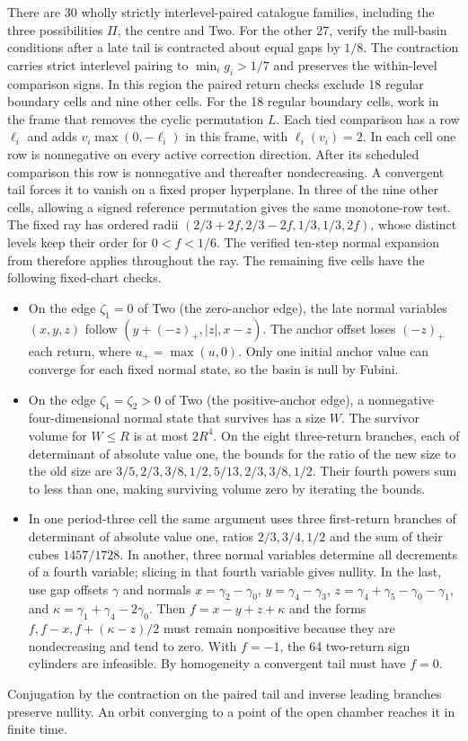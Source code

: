 \documentclass[11pt,reqno]{amsart}
\theoremstyle{definition}
\begin{document}
There are 30 wholly strictly interlevel-paired catalogue families,
including the three possibilities \(\Pi\), the centre and Two.
For the other 27, verify the null-basin conditions after
a late tail is contracted about equal gaps by \(1/8\).
The contraction carries strict interlevel pairing to
\(\min_i g_i>1/7\) and preserves the within-level comparison signs.
In this region the paired return
checks exclude 18 regular boundary cells and nine other cells.
For the 18 regular boundary cells, work in the frame that
removes the cyclic permutation \(L\). Each tied comparison has
a row \(\ell_i\) and adds \(v_i\max(0,-\ell_i)\) in this frame,
with \(\ell_i(v_i)=2\). In each cell one row is nonnegative on
every active correction direction. After its scheduled comparison
this row is nonnegative and thereafter nondecreasing. A
convergent tail forces it to vanish on a fixed proper hyperplane.
In three of the nine other cells, allowing a signed reference
permutation gives the same monotone-row test. The fixed ray
has ordered radii \((2/3+2f,2/3-2f,1/3,1/3,2f)\), whose distinct
levels keep their order for \(0<f<1/6\). The verified ten-step
normal expansion from \cite[Section~3]{G6} therefore applies
throughout the ray. The remaining five cells have the following
fixed-chart checks.
\begin{itemize}
\item On the edge \(\zeta_1=0\) of Two (the zero-anchor edge), the late
  normal variables \((x,y,z)\) follow \((y+(-z)_+,|z|,x-z)\). The anchor
  offset loses \((-z)_+\) each return, where \(u_+=\max(u,0)\).
  Only one initial anchor value can converge for each fixed
  normal state, so the basin is null by Fubini.
\item On the edge \(\zeta_1=\zeta_2>0\) of Two (the positive-anchor edge),
  a nonnegative four-dimensional normal state that survives has a size
  \(W\). The survivor volume for \(W\le R\) is at most
  \(2R^4\). On the eight three-return branches, each of
  determinant of absolute value one, the bounds for the
  ratio of the new size to the old size are
  \(3/5,2/3,3/8,1/2,5/13,2/3,3/8,1/2\).
  Their fourth powers sum to less than one, making surviving
  volume zero by iterating the bounds.
\item In one period-three cell the same argument uses three
  first-return branches of determinant of absolute value one,
  ratios \(2/3,3/4,1/2\) and the sum of their cubes
  \(1457/1728\). In another, three normal variables determine
  all decrements of a fourth variable; slicing in that
  fourth variable gives nullity. In the last, use gap
  offsets \(\gamma\) and normals \(x=\gamma_2-\gamma_0\),
  \(y=\gamma_4-\gamma_3\), \(z=\gamma_4+\gamma_5-\gamma_0-\gamma_1\), and
  \(\kappa=\gamma_1+\gamma_4-2\gamma_0\).
  Then \(f=x-y+z+\kappa\) and the forms
  \(f,f-x,f+(\kappa-z)/2\) must remain nonpositive because
  they are nondecreasing and tend to zero. With \(f=-1\),
  the 64 two-return sign cylinders are infeasible. By
  homogeneity a convergent tail must have \(f=0\).
\end{itemize}
Conjugation by the contraction on the paired tail and inverse
leading branches preserve nullity. An orbit converging to a
point of the open chamber reaches it in finite time.
\end{document}
